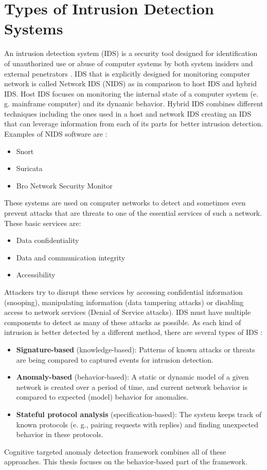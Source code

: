 \documentclass[thesis=B,english]{FITthesis}[2012/10/20]
\begin{document}
\section{Types of Intrusion Detection Systems}\label{sec:ids}

An intrusion detection system (IDS) is a security tool designed for identification of unauthorized use or abuse of computer systems by both system insiders and external penetrators \cite{mukherjee1994network}.
IDS that is explicitly designed for monitoring computer network is called Network IDS (NIDS) as in comparison to host IDS and hybrid IDS.
Host IDS focuses on monitoring the internal state of a computer system (e. g. mainframe computer) and its dynamic behavior.
Hybrid IDS combines different techniques including the ones used in a host and network IDS creating an IDS that can leverage information from each of its parts for better intrusion detection.
Examples of NIDS software are \cite{cooper2019bestids} :
\begin{itemize}
    \item Snort
    \item Suricata
    \item Bro Network Security Monitor
\end{itemize}
These systems are used on computer networks to detect and sometimes even prevent attacks that are threats to one of the essential services of such a network.
These basic services are\cite{mukherjee1994network}:
\begin{itemize}
    \item Data confidentiality
    \item Data and communication integrity
    \item Accessibility
\end{itemize}
Attackers try to disrupt these services by accessing confidential information (snooping), manipulating information (data tampering attacks) or disabling access to network services (Denial of Service attacks).
IDS must have multiple components to detect as many of these attacks as possible.
As each kind of intrusion is better detected by a different method, there are several types of IDS \cite{liao2013intrusion}:
\begin{itemize}
    \item \textbf{Signature-based} (knowledge-based): Patterns of known attacks or threats are being compared to captured events for intrusion detection.
    \item \textbf{Anomaly-based} (behavior-based): A static or dynamic model of a given network is created over a period of time, and current network behavior is compared to expected (model) behavior for anomalies.
    \item \textbf{Stateful protocol analysis} (specification-based): The system keeps track of known protocols (e. g., pairing requests with replies) and finding unexpected behavior in these protocols.
\end{itemize}
Cognitive targeted anomaly detection framework combines all of these approaches.
This thesis focuses on the behavior-based part of the framework.
\end{document}
